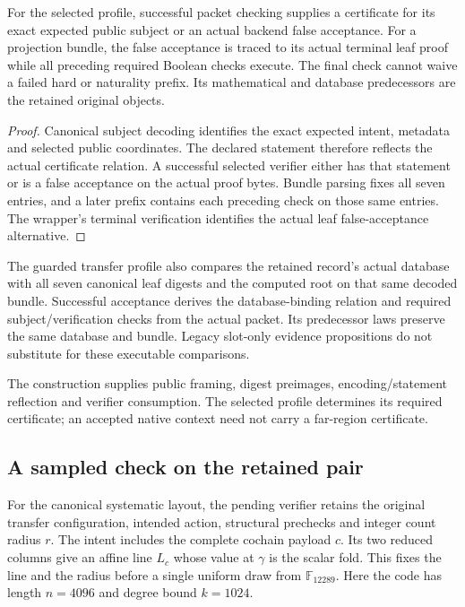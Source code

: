\begin{proposition}
For the selected profile, successful packet checking supplies a certificate
for its exact expected public subject or an actual backend false acceptance.
For a projection bundle, the false acceptance is traced to its actual
terminal leaf proof while all preceding required Boolean checks execute.
The final check cannot waive a failed hard or naturality prefix. Its
mathematical and database predecessors are the retained original objects.
\end{proposition}

\begin{proof}
Canonical subject decoding identifies the exact expected intent, metadata
and selected public coordinates. The declared statement therefore reflects
the actual certificate relation. A successful selected verifier either has
that statement or is a false acceptance on the actual proof bytes. Bundle
parsing fixes all seven entries, and a later prefix contains each preceding
check on those same entries. The wrapper's terminal verification identifies
the actual leaf false-acceptance alternative.
\end{proof}

The guarded transfer profile also compares the retained record's actual
database with all seven canonical leaf digests and the computed root on that
same decoded bundle. Successful acceptance derives the database-binding
relation and required subject/verification checks from the actual packet.
Its predecessor laws preserve the same database and bundle. Legacy slot-only
evidence propositions do not substitute for these executable comparisons.

The construction supplies public framing, digest preimages,
encoding/statement reflection and verifier consumption. The selected profile
determines its required certificate; an accepted native context need not
carry a far-region certificate.

\subsection{A sampled check on the retained pair}
\label{sec:sampled-mca}

For the canonical systematic layout, the pending verifier retains the
original transfer configuration, intended action, structural prechecks and
integer count radius \(r\). The intent includes the complete cochain payload
\(c\). Its two reduced columns give an affine line \(L_c\) whose value at
\(\gamma\) is the scalar fold. This fixes the line and the radius before a
single uniform draw from \(\mathbb F_{12289}\). Here the code has length
\(n=4096\) and degree bound \(k=1024\).

